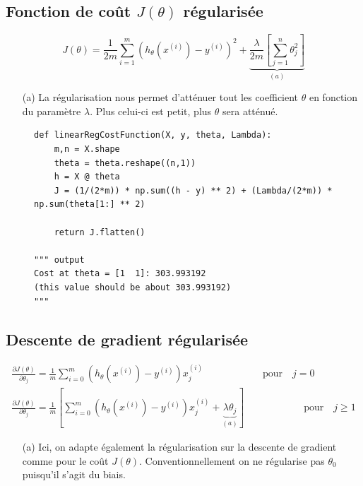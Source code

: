 \subsection{Fonction de coût $J(\theta)$ régularisée}


\begin{equation}\label{eq:cout-reg}
    J(\theta) = \frac{1}{2m} \sum_{i=1}^{m}(h_\theta(x^{(i)}) - y^{(i)})^2 + \underbrace{\frac{\lambda}{2m} \left[\sum_{j=1}^{n} \theta_j^2\right]}_{(a)}
 \end{equation} 

\begin{itemize}
    \item [(a)] La régularisation nous permet d'atténuer tout les coefficient $\theta$ en fonction du paramètre $\lambda$. Plus celui-ci est petit, plus $\theta$ sera atténué.
\end{itemize}

\begin{figure}[!h]
\begin{verbatim}
def linearRegCostFunction(X, y, theta, Lambda):
    m,n = X.shape 
    theta = theta.reshape((n,1)) 
    h = X @ theta
    J = (1/(2*m)) * np.sum((h - y) ** 2) + (Lambda/(2*m)) * np.sum(theta[1:] ** 2)

    return J.flatten()

""" output
Cost at theta = [1  1]: 303.993192 
(this value should be about 303.993192)
"""
\end{verbatim}   
\end{figure}


\subsection{Descente de gradient régularisée}
\begin{align}\label{eq:descente-gradient-reg}
    \frac{\partial J(\theta)}{\partial \theta_j} = \frac{1}{m} \sum_{i=0}^{m} (h_\theta(x^{(i)}) - y^{(i)}) x_j^{(i)} \qquad \qquad \qquad \text{pour} \quad j=0 \\
    \frac{\partial J(\theta)}{\partial \theta_j} = \frac{1}{m} \left[ \sum_{i=0}^{m} (h_\theta(x^{(i)}) - y^{(i)}) x_j^{(i)} + \underbrace{\lambda \theta_j}_{(a)} \right] \qquad \qquad \qquad \text{pour} \quad j\geq1 \nonumber
\end{align}

\begin{itemize}
    \item [(a)] Ici, on adapte également la régularisation sur la descente de gradient comme pour le coût $J(\theta)$. Conventionnellement on ne régularise pas $\theta_0$
    puisqu'il s'agit du biais.
\end{itemize}

